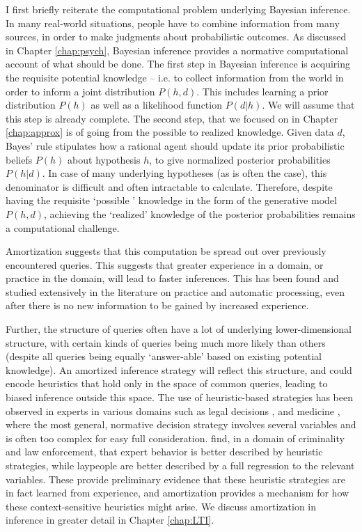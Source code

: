 I first briefly reiterate the computational problem underlying Bayesian inference. In many real-world situations, people have to combine information from many sources, in order to make judgments about probabilistic outcomes. As discussed in Chapter \ref{chap:psych}, Bayesian inference provides a normative computational account of what should be done. The first step in Bayesian inference is acquiring the requisite potential knowledge  -- i.e. to collect information from the world in order to inform a joint distribution $P(h,d)$. This includes learning a prior distribution $P(h)$ as well as a likelihood function $P(d | h)$. We will assume that this step is already complete. The second step, that we focused on in Chapter \ref{chap:approx} is of going from the possible to realized knowledge. Given data $d$, Bayes' rule stipulates how a rational agent should update its prior probabilistic beliefs $P(h)$ about hypothesis $h$, to give normalized posterior probabilities  $P(h |d)$.
In case of many underlying hypotheses (as is often the case), this denominator is difficult and often intractable to calculate. Therefore, despite having the requisite `possible ' knowledge in the form of the generative model $P(h,d)$, achieving the `realized' knowledge of the posterior probabilities remains a computational challenge.

Amortization suggests that this computation be spread out over previously encountered queries. This suggests that greater experience in a domain, or practice in the domain, will lead to faster inferences. This has been found and studied extensively in the literature on practice\citep{gobet2001chunking, newell1981mechanisms} and automatic processing\citep{shiffrin1977controlled, logan1988toward}, even after there is no new information to be gained by increased experience. 

Further, the structure of queries often have a lot of underlying lower-dimensional structure, with certain kinds of queries being much more likely than others (despite all queries being equally `answer-able' based on existing potential knowledge). An amortized inference strategy will reflect this structure, and could encode heuristics that hold only in the space of common queries, leading to biased inference outside this space. The use of heuristic-based strategies has been observed in experts in various domains such as legal decisions \citep{dhami2001bailing}, and medicine \citep{reyna2006physician}, where the most general, normative decision strategy involves several variables and is often too complex for easy full consideration. \citet{garcia2009take} find, in a domain of criminality and law enforcement, that expert behavior is better described by heuristic strategies, while laypeople are better described by a full regression to the relevant variables. These provide preliminary evidence that these heuristic strategies are in fact learned from experience, and amortization provides a mechanism for how these context-sensitive heuristics might arise. We discuss amortization in inference in greater detail in Chapter \ref{chap:LTI}.

